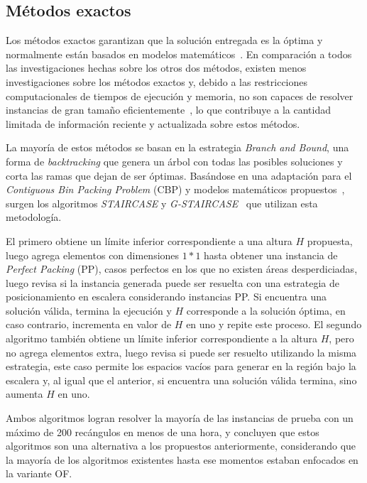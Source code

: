 \documentclass[letter, 10pt]{article}
\begin{document}
\subsection{M\'etodos exactos}

Los m\'etodos exactos garantizan que la soluci\'on entregada es la \'optima y normalmente est\'an basados en modelos matem\'aticos~\cite{oliveira2016survey}. En comparaci\'on a todos las investigaciones hechas sobre los otros dos m\'etodos, existen menos investigaciones sobre los m\'etodos exactos y, debido a las restricciones computacionales de tiempos de ejecuci\'on y memoria, no son capaces de resolver instancias de gran tama\~no eficientemente~\cite{he2013heuristics}, lo que contribuye a la cantidad limitada de informaci\'on reciente y actualizada sobre estos m\'etodos.

La mayor\'ia de estos m\'etodos se basan en la estrategia \emph{Branch and Bound}, una forma de \emph{backtracking} que genera un \'arbol con todas las posibles soluciones y corta las ramas que dejan de ser \'optimas. Bas\'andose en una adaptaci\'on para el \emph{Contiguous Bin Packing Problem} (CBP) y modelos matem\'aticos propuestos~\cite{martello2003exact}, surgen los algoritmos \emph{STAIRCASE} y \emph{G-STAIRCASE}~\cite{kenmochi2009exact} que utilizan esta metodolog\'ia.

El primero obtiene un l\'imite inferior correspondiente a una altura $H$ propuesta, luego agrega elementos con dimensiones $1 * 1$ hasta obtener una instancia de \emph{Perfect Packing} (PP), casos perfectos en los que no existen \'areas desperdiciadas, luego revisa si la instancia generada puede ser resuelta con una estrategia de posicionamiento en escalera considerando instancias PP. Si encuentra una soluci\'on v\'alida, termina la ejecuci\'on y $H$ corresponde a la soluci\'on \'optima, en caso contrario, incrementa en valor de $H$ en uno y repite este proceso. El segundo algoritmo tambi\'en obtiene un l\'imite inferior correspondiente a la altura $H$, pero no agrega elementos extra, luego revisa si puede ser resuelto utilizando la misma estrategia, este caso permite los espacios vac\'ios para generar en la regi\'on bajo la escalera y, al igual que el anterior, si encuentra una soluci\'on v\'alida termina, sino aumenta $H$ en uno.

Ambos algoritmos logran resolver la mayor\'ia de las instancias de prueba con un m\'aximo de 200 rec\'angulos en menos de una hora, y concluyen que estos algoritmos son una alternativa a los propuestos anteriormente, considerando que la mayor\'ia de los algoritmos existentes hasta ese momentos estaban enfocados en la variante OF.
\end{document}
